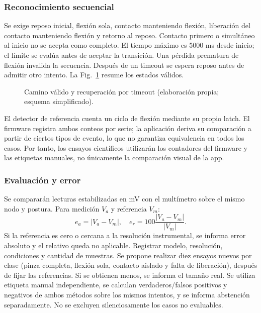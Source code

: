 \documentclass[11pt,letterpaper]{article}
\begin{document}
\subsubsection{Reconocimiento secuencial}
Se exige reposo inicial, flexión sola, contacto manteniendo flexión, liberación del contacto manteniendo flexión y retorno al reposo. Contacto primero o simultáneo al inicio no se acepta como completo. El tiempo máximo es 5000 ms desde inicio; el límite se evalúa antes de aceptar la transición. Una pérdida prematura de flexión invalida la secuencia. Después de un timeout se espera reposo antes de admitir otro intento. La Fig.~\ref{fig:fsm} resume los estados válidos.
\begin{figure}[htbp]\centering
{}
\caption{Camino válido y recuperación por timeout (elaboración propia; esquema simplificado).}\label{fig:fsm}
\end{figure}
El detector de referencia cuenta un ciclo de flexión mediante su propio latch. El firmware registra ambos conteos por serie; la aplicación deriva su comparación a partir de ciertos tipos de evento, lo que no garantiza equivalencia en todos los casos. Por tanto, los ensayos científicos utilizarán los contadores del firmware y las etiquetas manuales, no únicamente la comparación visual de la app.
\subsubsection{Evaluación y error}
Se compararán lecturas estabilizadas en mV con el multímetro sobre el mismo nodo y postura. Para medición $V_a$ y referencia $V_m$:
\begin{equation}e_a=|V_a-V_m|,\quad e_r=100\frac{|V_a-V_m|}{|V_m|}.\end{equation}
Si la referencia es cero o cercana a la resolución instrumental, se informa error absoluto y el relativo queda no aplicable. Registrar modelo, resolución, condiciones y cantidad de muestras. Se propone realizar diez ensayos nuevos por clase (pinza completa, flexión sola, contacto aislado y falta de liberación), después de fijar las referencias. Si se obtienen menos, se informa el tamaño real. Se utiliza etiqueta manual independiente, se calculan verdaderos/falsos positivos y negativos de ambos métodos sobre los mismos intentos, y se informa abstención separadamente. No se excluyen silenciosamente los casos no evaluables.
\end{document}
